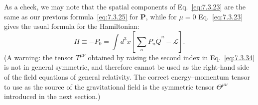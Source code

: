 As a check, we may note that the spatial components of Eq.~\eqref{eq:7.3.23} are the
same as our previous formula~\eqref{eq:7.3.25} for $\mathbf{P}$, while for $\mu=0$
Eq.~\eqref{eq:7.3.23} gives the usual formula for the Hamiltonian:
\begin{equation}
H\equiv-P_0=\int d^3x\left[\sum_nP_n\dot Q^n-\mathcal{L}\right].
\tag{7.3.35}\label{eq:7.3.35}
\end{equation}
(A warning: the tensor $T^{\mu\nu}$ obtained by raising the second index in
Eq.~\eqref{eq:7.3.34} is not in general symmetric, and therefore cannot be used as the
right-hand side of the field equations of general relativity. The correct
energy--momentum tensor to use as the source of the gravitational field is the
symmetric tensor $\Theta^{\mu\nu}$ introduced in the next section.)

